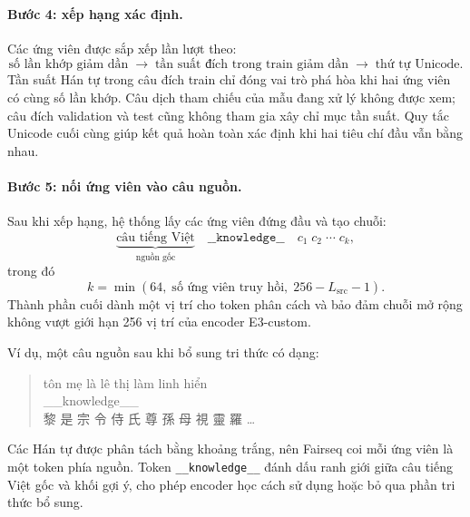 \documentclass[11pt]{article}
\begin{document}
\paragraph{Bước 4: xếp hạng xác định.}
Các ứng viên được sắp xếp lần lượt theo:
\[
  \text{số lần khớp giảm dần}
  \;\rightarrow\;
  \text{tần suất đích trong train giảm dần}
  \;\rightarrow\;
  \text{thứ tự Unicode}.
\]
Tần suất Hán tự trong câu đích train chỉ đóng vai trò phá hòa khi hai ứng viên
có cùng số lần khớp. Câu dịch tham chiếu của mẫu đang xử lý không được xem;
câu đích validation và test cũng không tham gia xây chỉ mục tần suất. Quy tắc
Unicode cuối cùng giúp kết quả hoàn toàn xác định khi hai tiêu chí đầu vẫn
bằng nhau.

\paragraph{Bước 5: nối ứng viên vào câu nguồn.}
Sau khi xếp hạng, hệ thống lấy các ứng viên đứng đầu và tạo chuỗi:
\[
  \underbrace{\text{câu tiếng Việt}}_{\text{nguồn gốc}}
  \quad
  \texttt{\_\_knowledge\_\_}
  \quad
  c_1\;c_2\;\cdots\;c_k,
\]
trong đó
\begin{equation}
  k=\min\!\left(
    64,\;
    \text{số ứng viên truy hồi},\;
    256-L_{\mathrm{src}}-1
  \right).
\end{equation}
Thành phần cuối dành một vị trí cho token phân cách và bảo đảm chuỗi mở rộng
không vượt giới hạn 256 vị trí của encoder E3-custom.

Ví dụ, một câu nguồn sau khi bổ sung tri thức có dạng:
\begin{quote}
  \small\ttfamily
  tôn mẹ là lê thị làm linh hiển\\
  \_\_knowledge\_\_\\
  黎 是 宗 令 侍 氏 尊 孫 母 視 靈 羅 \ldots
\end{quote}
Các Hán tự được phân tách bằng khoảng trắng, nên Fairseq coi mỗi ứng viên là
một token phía nguồn. Token \texttt{\_\_knowledge\_\_} đánh dấu ranh giới
giữa câu tiếng Việt gốc và khối gợi ý, cho phép encoder học cách sử dụng hoặc
bỏ qua phần tri thức bổ sung.
\end{document}
